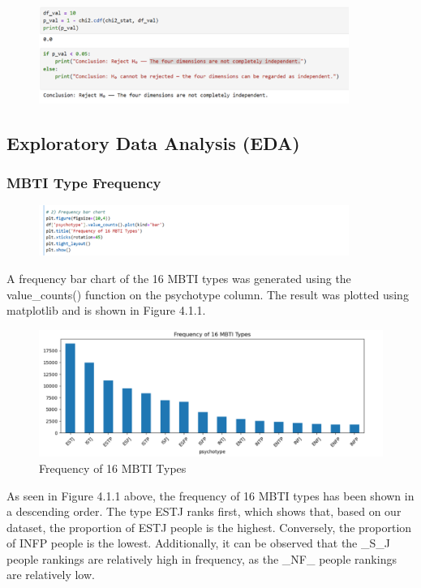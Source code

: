 \documentclass[12pt]{article}
\begin{document}
	\begin{figure}[H]
		\centering
		\includegraphics[width=0.9\textwidth]{Q1P11}
		
	\end{figure}
	
	\subsection{Exploratory Data Analysis (EDA)}
	\subsubsection{MBTI Type Frequency}
	\begin{figure}[H]
		\centering
		\includegraphics[width=0.9\textwidth]{Q1P3EDA1}
		
	\end{figure}
	
	A frequency bar chart of the 16 MBTI types was generated using the value\_counts() function on the psychotype column. The result was plotted using matplotlib and is shown in Figure 4.1.1.
	\begin{figure}[H]
		\centering
		\includegraphics{Q1EDA2} 
		\caption{Frequency of 16 MBTI Types}		
	\end{figure}
	
	As seen in Figure 4.1.1 above, the frequency of 16 MBTI types has been shown in a descending order. The type ESTJ ranks first, which shows that, based on our dataset, the proportion of ESTJ people is the highest. Conversely, the proportion of INFP people is the lowest. Additionally, it can be observed that the \_S\_J people rankings are relatively high in frequency, as the \_NF\_ people rankings are relatively low.
	
\end{document}
